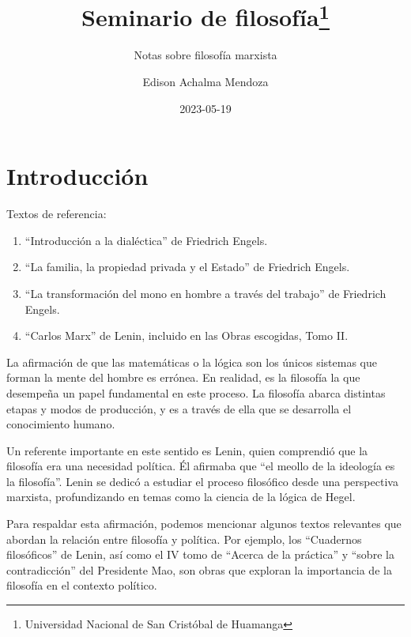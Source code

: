 \documentclass[
  letterpaper,
  DIV=11,
  numbers=noendperiod]{scrartcl}
\title{Seminario de filosofía\thanks{Universidad Nacional de San
Cristóbal de Huamanga}}
\subtitle{Notas sobre filosofía marxista}
\author{Edison Achalma Mendoza}
\date{2023-05-19}
\begin{document}
\maketitle
\ifdefined\Shaded\renewenvironment{Shaded}{\begin{tcolorbox}[breakable, interior hidden, sharp corners, frame hidden, borderline west={3pt}{0pt}{shadecolor}, boxrule=0pt, enhanced]}{\end{tcolorbox}}\fi

\hypertarget{introducciuxf3n}{%
\section{Introducción}\label{introducciuxf3n}}

Textos de referencia:

\begin{enumerate}
\def\labelenumi{\arabic{enumi}.}
\item
  ``Introducción a la dialéctica'' de Friedrich Engels.
\item
  ``La familia, la propiedad privada y el Estado'' de Friedrich Engels.
\item
  ``La transformación del mono en hombre a través del trabajo'' de
  Friedrich Engels.
\item
  ``Carlos Marx'' de Lenin, incluido en las Obras escogidas, Tomo II.
\end{enumerate}

La afirmación de que las matemáticas o la lógica son los únicos sistemas
que forman la mente del hombre es errónea. En realidad, es la filosofía
la que desempeña un papel fundamental en este proceso. La filosofía
abarca distintas etapas y modos de producción, y es a través de ella que
se desarrolla el conocimiento humano.

Un referente importante en este sentido es Lenin, quien comprendió que
la filosofía era una necesidad política. Él afirmaba que ``el meollo de
la ideología es la filosofía''. Lenin se dedicó a estudiar el proceso
filosófico desde una perspectiva marxista, profundizando en temas como
la ciencia de la lógica de Hegel.

Para respaldar esta afirmación, podemos mencionar algunos textos
relevantes que abordan la relación entre filosofía y política. Por
ejemplo, los ``Cuadernos filosóficos'' de Lenin, así como el IV tomo de
``Acerca de la práctica'' y ``sobre la contradicción'' del Presidente
Mao, son obras que exploran la importancia de la filosofía en el
contexto político.
\end{document}
